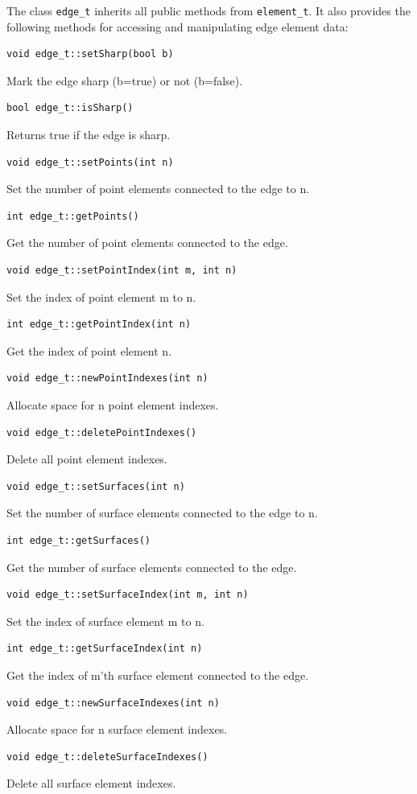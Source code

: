 \documentclass[a4paper,12pt]{article}
\begin{document}
The class {\tt edge\_t} inherits all public methods from {\tt element\_t}.
It also provides the following methods for accessing and manipulating edge
element data:
\begin{verbatim}
void edge_t::setSharp(bool b)
\end{verbatim}
Mark the edge sharp (b=true) or not (b=false).
\begin{verbatim}
bool edge_t::isSharp()
\end{verbatim}
Returns true if the edge is sharp.
\begin{verbatim} 
void edge_t::setPoints(int n)
\end{verbatim}
Set the number of point elements connected to the edge to n.
\begin{verbatim}
int edge_t::getPoints()
\end{verbatim}
Get the number of point elements connected to the edge.
\begin{verbatim}
void edge_t::setPointIndex(int m, int n)
\end{verbatim}
Set the index of point element m to n.
\begin{verbatim}
int edge_t::getPointIndex(int n)
\end{verbatim}
Get the index of point element n.
\begin{verbatim}
void edge_t::newPointIndexes(int n)
\end{verbatim}
Allocate space for n point element indexes.
\begin{verbatim}
void edge_t::deletePointIndexes()
\end{verbatim}
Delete all point element indexes.
\begin{verbatim}
void edge_t::setSurfaces(int n)
\end{verbatim}
Set the number of surface elements connected to the edge to n.
\begin{verbatim}
int edge_t::getSurfaces()
\end{verbatim}
Get the number of surface elements connected to the edge.
\begin{verbatim}
void edge_t::setSurfaceIndex(int m, int n)
\end{verbatim}
Set the index of surface element m to n.
\begin{verbatim}
int edge_t::getSurfaceIndex(int n)
\end{verbatim}
Get the index of m'th surface element connected to the edge.
\begin{verbatim}
void edge_t::newSurfaceIndexes(int n)
\end{verbatim}
Allocate space for n surface element indexes.
\begin{verbatim}
void edge_t::deleteSurfaceIndexes()
\end{verbatim}
Delete all surface element indexes.
\end{document}
